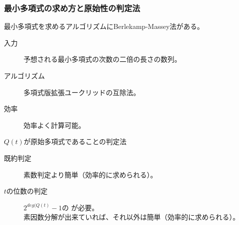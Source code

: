 \documentclass[cjk, dvips, handout, trans, xcolor=dvipsnames]{beamer}
\begin{document}
\begin{frame}[t]
  \frametitle{最小多項式の求め方と原始性の判定法}
  最小多項式を求めるアルゴリズムにBerlekamp-Massey法がある。
  \begin{description}
  \item[入力] 予想される最小多項式の次数の二倍の長さの数列。
  \item[アルゴリズム] 多項式版拡張ユークリッドの互除法。
  \item[効率] 効率よく計算可能。
  \end{description}

  \pause
  \vspace{\baselineskip}
  $Q(t)$が原始多項式であることの判定法
  \begin{description}
  \item[既約判定] 素数判定より簡単（効率的に求められる）。
  \item[$t$の位数の判定] $2^{deg(Q(t)}-1$の
    が必要。\\
    素因数分解が出来ていれば、それ以外は簡単（効率的に求められる）。
  \end{description}


\end{frame}
\end{document}

